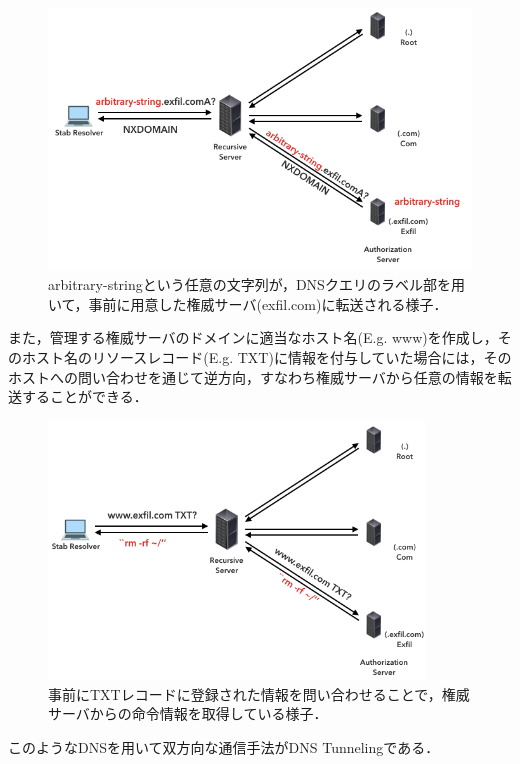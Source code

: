 \documentclass[12pt]{jarticle} %
\begin{document}
\begin{figure}[h]
 \centering
 \includegraphics[width=12.0cm]{images/dns-exfiltration.png}
 \caption{arbitrary-stringという任意の文字列が，DNSクエリのラベル部を用いて，事前に用意した権威サーバ(exfil.com)に転送される様子．}
 \label{dns-exfiltration}
\end{figure}

また，管理する権威サーバのドメインに適当なホスト名(E.g. www)を作成し，そのホスト名のリソースレコード(E.g. TXT)に情報を付与していた場合には，そのホストへの問い合わせを通じて逆方向，すなわち権威サーバから任意の情報を転送することができる．

\begin{figure}[h]
 \centering
 \includegraphics[width=10.0cm]{images/dns-tunneling.png}
 \caption{事前にTXTレコードに登録された情報を問い合わせることで，権威サーバからの命令情報を取得している様子．}
 \label{dns-exfiltration}
\end{figure}

このようなDNSを用いて双方向な通信手法がDNS Tunnelingである．
\end{document}
